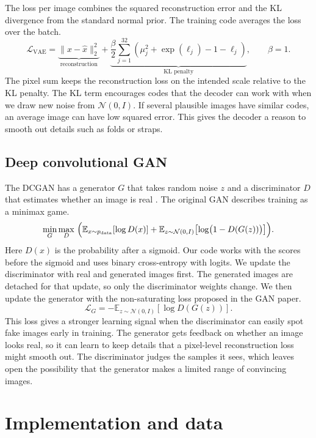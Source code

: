 \documentclass[11pt,letterpaper]{article}
\begin{document}
The loss per image combines the squared reconstruction error and the KL
divergence from the standard normal prior. The training code averages the
loss over the batch.
\[
  \mathcal{L}_{\mathrm{VAE}} =
  \underbrace{\lVert x-\hat{x}\rVert_2^2}_{\text{reconstruction}}
  + \underbrace{\frac{\beta}{2}\sum_{j=1}^{32}
    \left(\mu_j^2 + \exp(\ell_j)-1-\ell_j\right)}_{\text{KL penalty}},
  \qquad \beta=1.
\]
The pixel sum keeps the reconstruction loss on the intended scale
relative to the KL penalty. The KL term encourages codes that the decoder
can work with when we draw new noise from \(\mathcal{N}(0,I)\).
If several plausible images have similar codes, an
average image can have low squared error. This gives the decoder a reason
to smooth out details such as folds or straps.

\subsection{Deep convolutional GAN}

The DCGAN has a generator \(G\) that takes random noise \(z\) and a
discriminator \(D\) that estimates whether an image is real
\cite{goodfellow2014,radford2016}. The original GAN describes training as a
minimax game.
\[
  \min_G \max_D\ \Bigl(
  \mathbb{E}_{x\sim p_{\mathrm{data}}}\!\left[\log D(x)\right]
  + \mathbb{E}_{z\sim\mathcal{N}(0,I)}
      \!\left[\log\bigl(1-D(G(z))\bigr)\right]
  \Bigr).
\]
Here \(D(x)\) is the probability after a sigmoid. Our code works with the
scores before the sigmoid and uses binary cross-entropy with logits. We
update the discriminator with real and generated images first. The
generated images are detached for that update, so only the discriminator
weights change. We then update the generator with the non-saturating loss
proposed in the GAN paper.
\[
  \mathcal{L}_{G} =
  -\mathbb{E}_{z\sim\mathcal{N}(0,I)}\!\left[\log D(G(z))\right].
\]
This loss gives a stronger learning signal when the discriminator can
easily spot fake images early in training. The generator gets feedback on
whether an image looks real, so it can learn to keep details that a
pixel-level reconstruction loss might smooth out. The discriminator
judges the samples it sees, which leaves open the possibility that the
generator makes a limited range of convincing images.

\section{Implementation and data}
\end{document}
